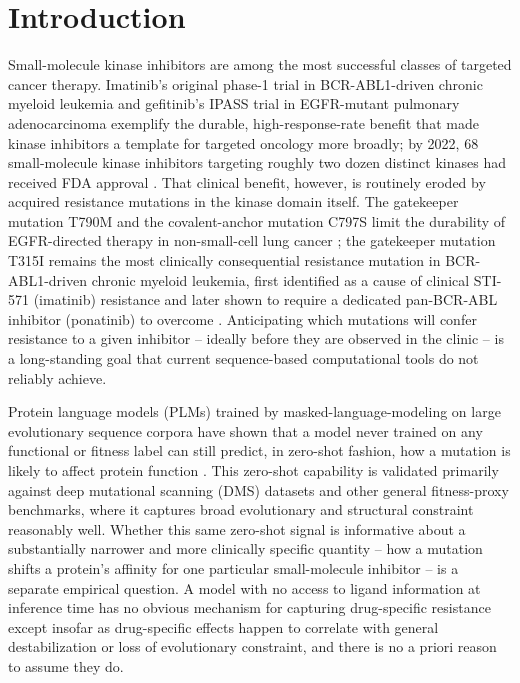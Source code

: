 \documentclass[pdflatex,sn-mathphys-num]{sn-jnl}%
\theoremstyle{thmstyleone}%
\theoremstyle{thmstyletwo}%
\theoremstyle{thmstylethree}%
\begin{document}

\maketitle

\section{Introduction}\label{sec1}

Small-molecule kinase inhibitors are among the most successful classes of targeted cancer therapy. Imatinib's original phase-1 trial in BCR-ABL1-driven chronic myeloid leukemia \citep{Druker2001} and gefitinib's IPASS trial in EGFR-mutant pulmonary adenocarcinoma \citep{Mok2009} exemplify the durable, high-response-rate benefit that made kinase inhibitors a template for targeted oncology more broadly; by 2022, 68 small-molecule kinase inhibitors targeting roughly two dozen distinct kinases had received FDA approval \citep{Roskoski2022}. That clinical benefit, however, is routinely eroded by acquired resistance mutations in the kinase domain itself. The gatekeeper mutation T790M and the covalent-anchor mutation C797S limit the durability of EGFR-directed therapy in non-small-cell lung cancer \citep{Kobayashi2005,Thress2015}; the gatekeeper mutation T315I remains the most clinically consequential resistance mutation in BCR-ABL1-driven chronic myeloid leukemia, first identified as a cause of clinical STI-571 (imatinib) resistance and later shown to require a dedicated pan-BCR-ABL inhibitor (ponatinib) to overcome \citep{Gorre2001,OHare2009}. Anticipating which mutations will confer resistance to a given inhibitor -- ideally before they are observed in the clinic -- is a long-standing goal that current sequence-based computational tools do not reliably achieve.

Protein language models (PLMs) trained by masked-language-modeling on large evolutionary sequence corpora have shown that a model never trained on any functional or fitness label can still predict, in zero-shot fashion, how a mutation is likely to affect protein function \citep{Meier2021,Rives2021}. This zero-shot capability is validated primarily against deep mutational scanning (DMS) datasets and other general fitness-proxy benchmarks, where it captures broad evolutionary and structural constraint reasonably well. Whether this same zero-shot signal is informative about a substantially narrower and more clinically specific quantity -- how a mutation shifts a protein's affinity for one particular small-molecule inhibitor -- is a separate empirical question. A model with no access to ligand information at inference time has no obvious mechanism for capturing drug-specific resistance except insofar as drug-specific effects happen to correlate with general destabilization or loss of evolutionary constraint, and there is no a priori reason to assume they do.
\end{document}
